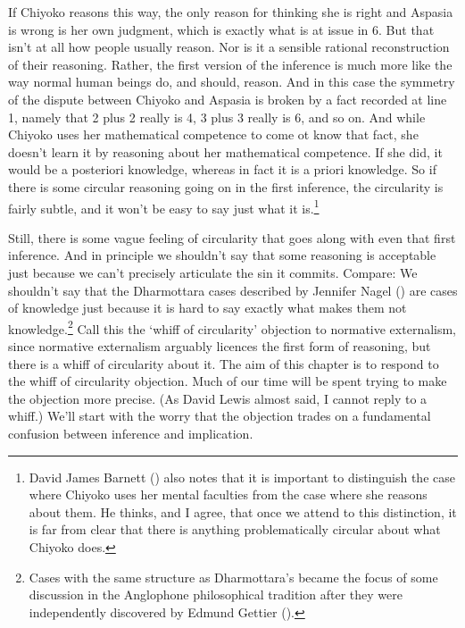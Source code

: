\documentclass[
  10pt,
  letterpaper,
  twoside]{scrbook}
\begin{document}
If {Chiyoko} reasons this way, the only reason for thinking she is right
and {Aspasia} is wrong is her own judgment, which is exactly what is at
issue in 6. But that isn't at all how people usually reason. Nor is it a
sensible rational reconstruction of their reasoning. Rather, the first
version of the inference is much more like the way normal human beings
do, and should, reason. And in this case the symmetry of the dispute
between {Chiyoko} and {Aspasia} is broken by a fact recorded at line 1,
namely that 2 plus 2 really is 4, 3 plus 3 really is 6, and so on. And
while {Chiyoko} uses her mathematical competence to come ot know that
fact, she doesn't learn it by reasoning about her mathematical
competence. If she did, it would be a posteriori knowledge, whereas in
fact it is a priori knowledge. So if there is some circular reasoning
going on in the first inference, the circularity is fairly subtle, and
it won't be easy to say just what it is.\footnote{David James Barnett
  () also notes that it is important to
  distinguish the case where Chiyoko uses her mental faculties from the
  case where she reasons about them. He thinks, and I agree, that once
  we attend to this distinction, it is far from clear that there is
  anything problematically circular about what Chiyoko does.}

Still, there is some vague feeling of circularity that goes along with
even that first inference. And in principle we shouldn't say that some
reasoning is acceptable just because we can't precisely articulate the
sin it commits. Compare: We shouldn't say that the Dharmottara cases
described by Jennifer Nagel () are
cases of knowledge just because it is hard to say exactly what makes
them not knowledge.\footnote{Cases with the same structure as
  Dharmottara's became the focus of some discussion in the Anglophone
  philosophical tradition after they were independently discovered by
  Edmund Gettier ().} Call this the
`whiff of circularity' objection to normative externalism, since
normative externalism arguably licences the first form of reasoning, but
there is a whiff of circularity about it. The aim of this chapter is to
respond to the whiff of circularity objection. Much of our time will be
spent trying to make the objection more precise. (As David Lewis almost
said, I cannot reply to a whiff.) We'll start with the worry that the
objection trades on a fundamental confusion between inference and
implication.
\end{document}
